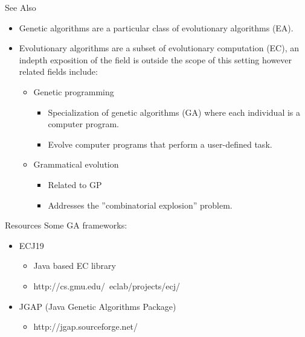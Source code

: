 \documentclass[%
pdf,
colorBG,
slideColor,
tcrico,
]{prosper}
\begin{document}
\begin{slide}{ See Also }
\tiny
\begin{itemize}
 \item Genetic algorithms are a particular class of evolutionary algorithms (EA).
\item Evolutionary algorithms are a subset of evolutionary computation (EC), an indepth exposition of the field is outside the scope of this setting however related fields include:
\begin{itemize}
\item Genetic programming
	\begin{itemize}
	\item Specialization of genetic algorithms (GA) where each individual is a computer program.  
 	\item Evolve computer programs that perform a user-defined task.
	\end{itemize}
 \item Grammatical evolution 
\begin{itemize}
	\item Related to GP
\item Addresses the ''combinatorial explosion'' problem.  
	\end{itemize}

\end{itemize}

\end{itemize}
\end{slide}


\begin{slide}{Resources}
Some GA frameworks:
	\begin{itemize}
	\item ECJ19 
		\begin{itemize}
		\item Java based EC library
		\item http://cs.gmu.edu/~eclab/projects/ecj/
		\end{itemize}
	
	\item JGAP (Java Genetic Algorithms Package)
		\begin{itemize}
		\item http://jgap.sourceforge.net/
		\end{itemize}
	
	\end{itemize}
\end{slide}
\end{document}
